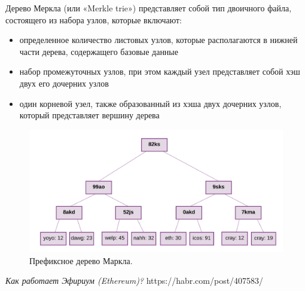 \documentclass{article}
\begin{document}
Дерево Меркла (или «Merkle trie») представляет собой тип двоичного файла, состоящего из набора узлов, которые включают:

\begin{itemize}
 \item определенное количество листовых узлов, которые располагаются в нижней части дерева, содержащего базовые данные
 \item набор промежуточных узлов, при этом каждый узел представляет собой хэш двух его дочерних узлов
 \item один корневой узел, также образованный из хэша двух дочерних узлов, который представляет вершину дерева
\end{itemize}


\begin{figure}
    \centering
    \includegraphics[scale=0.25]{scheme_9}
    \caption{Префиксное дерево Маркла.}
    \label{fig:scheme_9}
\end{figure}
















\begin{thebibliography}{9}

	  \emph{Как работает Эфириум (Ethereum)?}
	  https://habr.com/post/407583/

\end{thebibliography}
\end{document}

